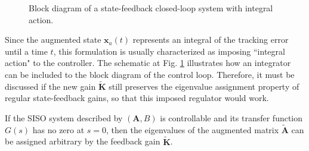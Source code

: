 \documentclass[a4paper,11pt]{book}
\numberwithin{figure}{chapter}
\numberwithin{equation}{chapter}
\numberwithin{table}{chapter}
\newtheorem{theorem}{Theorem}[chapter]
\theoremstyle{definition}
\newcounter{boxed-theorem}
\newenvironment{boxed-theorem}[1]
{\colorlet{shadecolor}{pastelBlue2!10} \begin{shaded} \begin{theorem}{#1}}
{\end{theorem} \end{shaded}}
\newcounter{boxed-definition}
\newcounter{boxed-example}
\begin{document}
\begin{figure}[ht]
{ 
    }
    \caption{Block diagram of a state-feedback closed-loop system with integral action.}
    \label{fig:tracking02}
\end{figure}

Since the augmented state $\bm{x}_a(t)$ represents an integral of the tracking error until a time $t$, this formulation is usually characterized as imposing ``integral action" to the controller. The schematic at Fig. \ref{fig:tracking02} illustrates how an integrator can be included to the block diagram of the control loop. Therefore, it must be discussed if the new gain $\tilde{\bm{K}}$ still preserves the eigenvalue assignment property of regular state-feedback gains, so that this imposed regulator would work.

\begin{boxed-theorem}{} \label{th:augmentedCtrb}
    If the SISO system described by $(\bm{A}, B)$ is controllable and its transfer function $G(s)$ has no zero at $s = 0$, then the eigenvalues of the augmented matrix $\tilde{\bm{A}}$ can be assigned arbitrary by the feedback gain $\tilde{\bm{K}}$.
\end{boxed-theorem}
\end{document}

